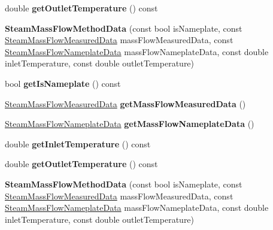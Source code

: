 \begin{DoxyCompactItemize}
double {\bfseries get\+Outlet\+Temperature} () const
\item 
\mbox{\label{class_steam_mass_flow_method_data_a00d8f1917c439b0b0ccaa6ceae8b8fe6}} 
{\bfseries Steam\+Mass\+Flow\+Method\+Data} (const bool is\+Nameplate, const \hyperlink{class_steam_mass_flow_measured_data}{Steam\+Mass\+Flow\+Measured\+Data} mass\+Flow\+Measured\+Data, const \hyperlink{class_steam_mass_flow_nameplate_data}{Steam\+Mass\+Flow\+Nameplate\+Data} mass\+Flow\+Nameplate\+Data, const double inlet\+Temperature, const double outlet\+Temperature)
\item 
\mbox{\label{class_steam_mass_flow_method_data_adfbfa5ce4fa4d7ea0d35b2a60d6d117a}} 
bool {\bfseries get\+Is\+Nameplate} () const
\item 
\mbox{\label{class_steam_mass_flow_method_data_a5cd24d82a93883a7736dfed6faf6e8d8}} 
\hyperlink{class_steam_mass_flow_measured_data}{Steam\+Mass\+Flow\+Measured\+Data} {\bfseries get\+Mass\+Flow\+Measured\+Data} ()
\item 
\mbox{\label{class_steam_mass_flow_method_data_afd8082bfcb1d701c7b0da01457b97a88}} 
\hyperlink{class_steam_mass_flow_nameplate_data}{Steam\+Mass\+Flow\+Nameplate\+Data} {\bfseries get\+Mass\+Flow\+Nameplate\+Data} ()
\item 
\mbox{\label{class_steam_mass_flow_method_data_a4029950bd73f51a58b7ff42a6b6814e9}} 
double {\bfseries get\+Inlet\+Temperature} () const
\item 
\mbox{\label{class_steam_mass_flow_method_data_a6fb7efd7f7195fd63e0a23e83ebfdcea}} 
double {\bfseries get\+Outlet\+Temperature} () const
\item 
\mbox{\label{class_steam_mass_flow_method_data_a00d8f1917c439b0b0ccaa6ceae8b8fe6}} 
{\bfseries Steam\+Mass\+Flow\+Method\+Data} (const bool is\+Nameplate, const \hyperlink{class_steam_mass_flow_measured_data}{Steam\+Mass\+Flow\+Measured\+Data} mass\+Flow\+Measured\+Data, const \hyperlink{class_steam_mass_flow_nameplate_data}{Steam\+Mass\+Flow\+Nameplate\+Data} mass\+Flow\+Nameplate\+Data, const double inlet\+Temperature, const double outlet\+Temperature)

\end{DoxyCompactItemize}
